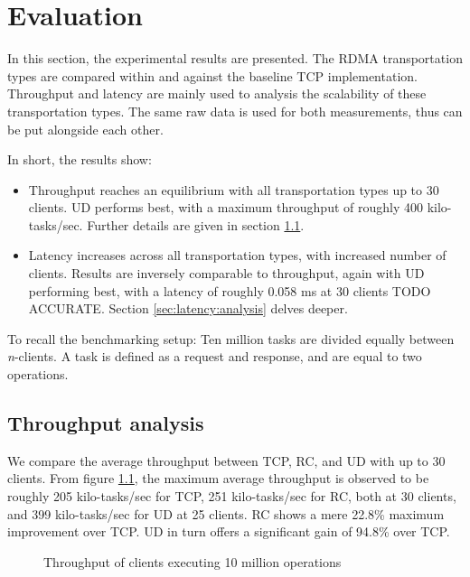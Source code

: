 
\chapter{Evaluation}\label{ch:evaluation} %



\ifpdf
    \graphicspath{{figures/PNG}}
\else
    \graphicspath{{7/figures/EPS/}{7/figures/}}
\fi


% 
In this section, the experimental results are presented.
The RDMA transportation types are compared within and against the baseline TCP implementation.
Throughput and latency are mainly used to analysis the scalability of these transportation types.
The same raw data is used for both measurements, thus can be put alongside each other.

In short, the results show:
\begin{itemize}
    \item Throughput reaches an equilibrium with all transportation types up to 30 clients.
    UD performs best, with a maximum throughput of roughly 400 kilo-tasks/sec.
    Further details are given in section \ref{sec:throughput-analysis}.
    \item Latency increases across all transportation types, with increased number of clients.
    Results are inversely comparable to throughput, again with UD performing best, with a latency of roughly 0.058 ms at 30 clients TODO ACCURATE.
    Section \ref{sec:latency:analysis} delves deeper.
\end{itemize}

To recall the benchmarking setup:
Ten million tasks are divided equally between \textit{n}-clients.
A task is defined as a request and response, and are equal to two operations.

\section{Throughput analysis}\label{sec:throughput-analysis}
We compare the average throughput between TCP, RC, and UD with up to 30 clients.
From figure \ref{fig:throughput-30}, the maximum average throughput is observed to be roughly 205 kilo-tasks/sec for TCP, 251 kilo-tasks/sec for RC, both at 30 clients, and 399 kilo-tasks/sec for UD at 25 clients.
RC shows a mere 22.8\% maximum improvement over TCP.
UD in turn offers a significant gain of 94.8\% over TCP.
\begin{figure}
    \centering
    
    \caption{Throughput of clients executing 10 million operations}
    \label{fig:throughput-30}
\end{figure}

